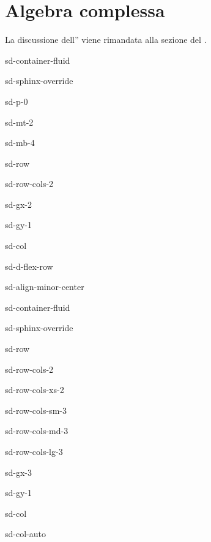\documentclass[letterpaper,10pt,italian]{jupyterBook}
\begin{document}
\chapter{Algebra complessa}
\label{\detokenize{ch/algebra/complex-algebra-link:algebra-complessa}}\label{\detokenize{ch/algebra/complex-algebra-link:math-hs-algebra-complex-link}}\label{\detokenize{ch/algebra/complex-algebra-link::doc}}
\sphinxAtStartPar
La discussione dell”{\hyperref[\detokenize{ch/algebra/complex-algebra:math-hs-algebra-complex}]{}} viene rimandata alla sezione del {\hyperref[\detokenize{ch/precalculus:math-hs-precalculus}]{}}.

\sphinxstepscope

\begin{sphinxuseclass}{sd-container-fluid}
\begin{sphinxuseclass}{sd-sphinx-override}
\begin{sphinxuseclass}{sd-p-0}
\begin{sphinxuseclass}{sd-mt-2}
\begin{sphinxuseclass}{sd-mb-4}
\begin{sphinxuseclass}{sd-row}
\begin{sphinxuseclass}{sd-row-cols-2}
\begin{sphinxuseclass}{sd-gx-2}
\begin{sphinxuseclass}{sd-gy-1}
\begin{sphinxuseclass}{sd-col}
\begin{sphinxuseclass}{sd-d-flex-row}
\begin{sphinxuseclass}{sd-align-minor-center}
\begin{sphinxuseclass}{sd-container-fluid}
\begin{sphinxuseclass}{sd-sphinx-override}
\begin{sphinxuseclass}{sd-row}
\begin{sphinxuseclass}{sd-row-cols-2}
\begin{sphinxuseclass}{sd-row-cols-xs-2}
\begin{sphinxuseclass}{sd-row-cols-sm-3}
\begin{sphinxuseclass}{sd-row-cols-md-3}
\begin{sphinxuseclass}{sd-row-cols-lg-3}
\begin{sphinxuseclass}{sd-gx-3}
\begin{sphinxuseclass}{sd-gy-1}
\begin{sphinxuseclass}{sd-col}
\begin{sphinxuseclass}{sd-col-auto}

\end{sphinxuseclass}
\end{sphinxuseclass}
\end{sphinxuseclass}
\end{sphinxuseclass}
\end{sphinxuseclass}
\end{sphinxuseclass}
\end{sphinxuseclass}
\end{sphinxuseclass}
\end{sphinxuseclass}
\end{sphinxuseclass}
\end{sphinxuseclass}
\end{sphinxuseclass}
\end{sphinxuseclass}
\end{sphinxuseclass}
\end{sphinxuseclass}
\end{sphinxuseclass}
\end{sphinxuseclass}
\end{sphinxuseclass}
\end{sphinxuseclass}
\end{sphinxuseclass}
\end{sphinxuseclass}
\end{sphinxuseclass}
\end{sphinxuseclass}
\end{sphinxuseclass}
\end{document}
